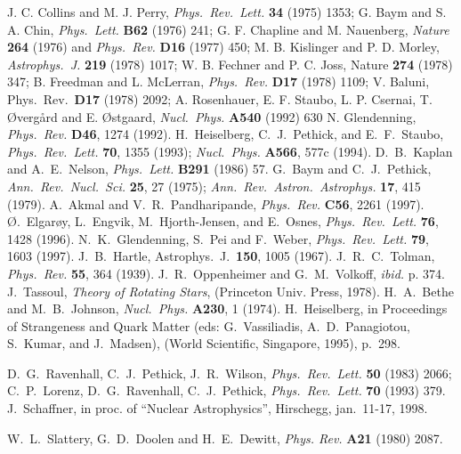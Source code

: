 \begin{multicols}{2}
\begin{references}
  J. C. Collins and M. J. Perry, {\it Phys.\ Rev.\ Lett.} {\bf 34} (1975)
 1353;
  G. Baym and S. A. Chin, {\it Phys.\ Lett.} {\bf B62} (1976) 241;
  G. F. Chapline and M. Nauenberg,
  {\it Nature} {\bf 264} (1976) and {\it Phys.\ Rev.} {\bf D16} (1977) 450;
  M. B. Kislinger and P. D. Morley, {\it Astrophys.\ J.} {\bf 219} (1978) 1017;
  W. B. Fechner and P. C. Joss, Nature {\bf 274} (1978) 347;
  B. Freedman and L. McLerran, {\it Phys.\ Rev.} {\bf D17} (1978) 1109;
  V. Baluni, Phys.\ Rev.\ {\bf D17} (1978) 2092;
  A. Rosenhauer, E. F. Staubo, L. P. Csernai, T. \O verg\aa rd 
        and E. \O stgaard, {\it Nucl.\ Phys.} {\bf A540} (1992) 630
 N. Glendenning, {\it Phys.\ Rev.} {\bf D46}, 1274 (1992).
 H.\ Heiselberg, C.\ J.\ Pethick, and E.\ F.\ Staubo, 
              {\it Phys.\ Rev.\ Lett.} {\bf 70}, 1355 (1993);
              {\it Nucl.\ Phys.} {\bf A566}, 577c (1994).
 D.\ B.\  Kaplan and A.\ E.\ Nelson, {\it Phys.\ Lett.} 
             {\bf B291} (1986) 57.
 G.\ Baym and C.\ J.\ Pethick, {\it Ann.\ Rev.\ Nucl.\ Sci.}
       {\bf 25},
27 (1975); {\it Ann.\ Rev.\ Astron.\ Astrophys.} {\bf 17}, 415 (1979).
 A.\ Akmal and V.\ R.\ Pandharipande, {\it Phys.\ Rev.} 
                {\bf C56}, 2261 (1997).
 \O.\ Elgar\o y, L.\ Engvik, M.\ Hjorth-Jensen, and 
                   E.\ Osnes, {\it Phys.\ Rev.\ Lett.} {\bf 76}, 1428 (1996).
 N.\ K.\ Glendenning, S.\ Pei and F.\ Weber, 
              {\it Phys.\ Rev.\ Lett.} {\bf 79}, 1603 (1997).
 J.\ B.\ Hartle, Astrophys.\ J.\ {\bf 150}, 1005 (1967).
 J.\ R.\ C.\ Tolman, {\it Phys.\ Rev.} {\bf 55}, 364 (1939).
              J.\ R.\ Oppenheimer and G.\ M.\ Volkoff, {\it ibid.} p. 374.
 J.\ Tassoul, {\em Theory of Rotating Stars}, (Princeton Univ.
                  Press, 1978).
 H.\ A.\ Bethe and M.\ B.\ Johnson, 
             {\it Nucl.\ Phys.} {\bf A230}, 1 (1974).
 H.\ Heiselberg, in
      Proceedings of  Strangeness and Quark Matter (eds: G.\ Vassiliadis,
      A.\ D.\ Panagiotou, S.\ Kumar, and J.\ Madsen), (World Scientific,
      Singapore,  1995), p.\ 298. 

 D.\ G.\ Ravenhall, C.\ J.\ Pethick, J.\ R.\ Wilson,
         {\it Phys.\ Rev.\ Lett.} {\bf 50} (1983) 2066; C.\ P.\ Lorenz,
   D.\ G.\  Ravenhall, C.\ J.\ Pethick, 
   {\it Phys.\ Rev.\ Lett.} {\bf 70} (1993) 379.
 J.\ Schaffner, in proc. of ``Nuclear Astrophysics'',
                    Hirschegg, jan.\ 11-17, 1998.
 

 W.\ L.\ Slattery, G.\ D.\  Doolen and H.\ E.\ Dewitt, 
              {\it Phys. Rev.} {\bf A21} (1980) 2087.

\end{references} 

\end{multicols}

